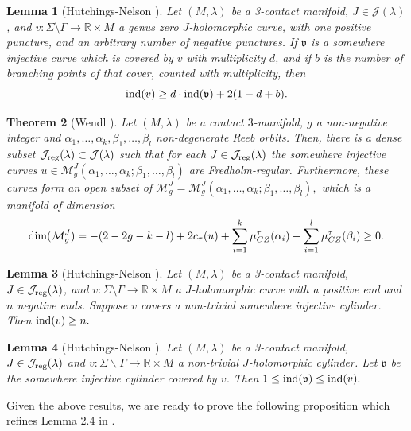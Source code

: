 \documentclass{amsart}
\newcommand{\R}{\mathbb{R}}
\newcommand{\M}{\mathcal{M}}
\newtheorem{theorem}{Theorem}[section]
\newtheorem{lemma}[theorem]{Lemma}
\newcommand{\ind}{\textnormal{ind}}
\begin{document}
\begin{lemma}[Hutchings-Nelson \cite{HN}] \label{2.2} 
Let $(M,\lambda)$ be a 3-contact manifold, $J \in \mathcal{J}(\lambda)$, and $v:\Sigma \setminus \Gamma \to \R \times M$ a genus zero $J$-holomorphic curve, with one positive puncture, and an arbitrary number of negative punctures. If $\mathfrak{v}$ is a {\it somewhere injective} curve which is covered by $v$  with multiplicity $d$, and if $b$ is the number of branching points of that cover, counted with multiplicity, then
$$\ind(v) \geq d \cdot \ind(\mathfrak{v})+2(1-d+b).$$
\end{lemma}

\begin{theorem}[Wendl \cite{W16}] \label{thmreg}
Let $(M,\lambda)$ be a contact $3$-manifold, $g$ a non-negative integer and $\alpha_1, \ldots, \alpha_k, \beta_1,\ldots,\beta_l$ non-degenerate Reeb orbits. Then, there is a dense subset
$
\mathcal{J}_{\rm reg}(\lambda) \subset \mathcal{J}(\lambda)
$
such that for each $J \in \mathcal{J}_{\rm reg}(\lambda)$ the  {\it somewhere injective} curves $u \in \M^J_g(\alpha_1, \ldots, \alpha_k; \beta_1,\ldots,\beta_l)$ are Fredholm-regular. Furthermore, these curves form an open subset of $\M^J_g=\M^J_g(\alpha_1, \ldots, \alpha_k; \beta_1,\ldots,\beta_l),$ which is a manifold of dimension 
$${\rm dim}(\M^J_g)=-(2-2g-k-l)+2c_{\tau}(u)+\sum_{i=1}^k \mu_{CZ}^{\tau}(\alpha_i)-\sum_{i=1}^l \mu_{CZ}^{\tau}(\beta_i)\geq 0.$$
\end{theorem}

\begin{lemma}[Hutchings-Nelson \cite{HN}] \label{2.3} 
Let $(M,\lambda)$ be a 3-contact manifold, $J \in \mathcal{J}_{\rm reg}(\lambda)$, and $v:\Sigma \setminus \Gamma \to \R \times M$ a $J$-holomorphic curve with a positive end and $n$ negative ends. Suppose $v$ covers a non-trivial somewhere injective cylinder. Then $\ind(v) \geq n.$
\end{lemma} 



\begin{lemma}[Hutchings-Nelson \cite{HN}] \label{2.5} 
Let $(M,\lambda)$ be a 3-contact manifold, $J \in \mathcal{J}_{\rm reg}(\lambda)$ and $v:\Sigma \backslash \Gamma \to \R \times M$ a    non-trivial $J$-holomorphic cylinder. Let $\mathfrak{v}$ be the  {\it somewhere injective} cylinder covered by $v$. Then $1 \leq \ind(\mathfrak{v}) \leq \ind(v).$
\end{lemma} 

Given the above results, we are ready to prove the following proposition which refines Lemma 2.4 in \cite{HN}.
\end{document}
